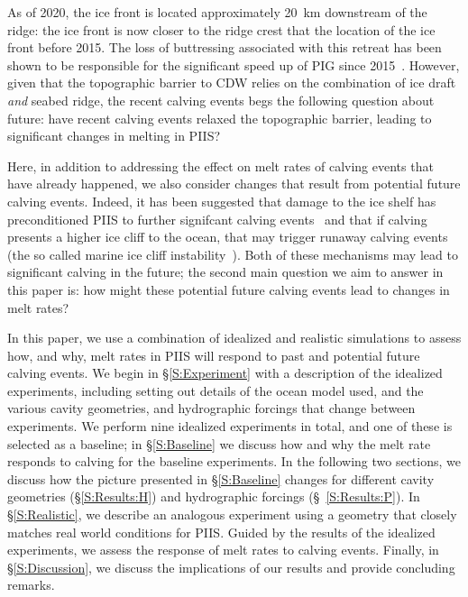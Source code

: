 \documentclass[draft]{agujournal2019}
\begin{document}
As of 2020, the ice front is located approximately 20~km downstream of the ridge: the ice front is now closer to the ridge crest that the location of the ice front before 2015. The loss of buttressing associated with this retreat has been shown to be responsible for the significant speed up of PIG since 2015~\cite{Joughin2021ScienceAdv}. However, given that the topographic barrier to CDW relies on the combination of ice draft \textit{and} seabed ridge, the recent calving events begs the following question about future: have recent calving events relaxed the topographic barrier, leading to significant changes in melting in PIIS?

Here, in addition to addressing the effect on melt rates of calving events that have already happened, we also consider changes that result from potential future calving events. Indeed, it has been suggested that damage to the ice shelf has preconditioned PIIS to further signifcant calving events~\cite{Lhermitte2020PNAS} and that if calving presents a higher ice cliff to the ocean, that may trigger runaway calving events (the so called marine ice cliff instability~\cite{DeConto2016Nature}). Both of these mechanisms may lead to significant calving in the future; the second main question we aim to answer in this paper is: how might these potential future calving events lead to changes in melt rates?

In this paper, we use a combination of idealized and realistic simulations to assess how, and why, melt rates in PIIS will respond to past and potential future calving events. We begin in \S\ref{S:Experiment} with a description of the idealized experiments, including setting out details of the ocean model used, and the various cavity geometries, and hydrographic forcings that change between experiments. We perform nine idealized experiments in total, and one of these is selected as a baseline; in \S\ref{S:Baseline} we discuss how and why the melt rate responds to calving for the baseline experiments. In the following two sections, we discuss how the picture presented in \S\ref{S:Baseline} changes for different cavity geometries (\S\ref{S:Results:H}) and hydrographic forcings (\S~\ref{S:Results:P}). In \S\ref{S:Realistic}, we describe an analogous experiment using a geometry that closely matches real world conditions for PIIS. Guided by the results of the idealized experiments, we assess the response of melt rates to calving events. Finally, in \S\ref{S:Discussion}, we discuss the implications of our results and provide concluding remarks.
\end{document}
